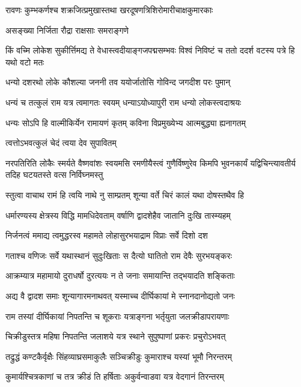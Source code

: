 \twolineshloka
{रावणः कुम्भकर्णश्च शक्रजित्प्रमुखास्तथा}
{खरदूषणत्रिशिरोमारीचाक्षकुमारकाः}%

\onelineshloka
{असङ्ख्या निर्जिता रौद्रा राक्षसाः समराङ्गणे}%

\twolineshloka
{किं वच्मि लोकेश सुकीर्त्तिमद्य ते वेधास्त्वदीयाङ्गजपद्मसम्भवः}
{विश्वं निविष्टं च ततो ददर्श वटस्य पत्रे हि यथो वटो मतः}%

\twolineshloka
{धन्यो दशरथो लोके कौशल्या जननी तव}
{ययोर्जातोसि गोविन्द जगदीश परः पुमान्}%

\twolineshloka
{धन्यं च तत्कुलं राम यत्र त्वमागतः स्वयम्}
{धन्याऽयोध्यापुरी राम धन्यो लोकस्त्वदाश्रयः}%

\twolineshloka
{धन्यः सोऽपि हि वाल्मीकिर्येन रामायणं कृतम्}
{कविना विप्रमुख्येभ्य आत्मबुद्ध्या ह्यनागतम्}%

\onelineshloka
{त्वत्तोऽभवत्कुलं चेदं त्वया देव सुपावितम्}%

\twolineshloka
{नरपतिरिति लोकैः स्मर्यते वैष्णवांशः स्वयमसि रमणीयैस्त्वं गुणैर्विष्णुरेव}
{किमपि भुवनकार्यं यद्विचिन्त्यावतीर्य तदिह घटयतस्ते वत्स निर्विघ्नमस्तु}%

\twolineshloka
{स्तुत्वा वाचाथ रामं हि त्वयि नाथे नु साम्प्रतम्}
{शून्या वर्ते चिरं कालं यथा दोषस्तथैव हि}%

\twolineshloka
{धर्मारण्यस्य क्षेत्रस्य विद्धि मामधिदेवताम्}
{वर्षाणि द्वादशेहैव जातानि दुःखि तास्म्यहम्}%

\twolineshloka
{निर्जनत्वं ममाद्य त्वमुद्धरस्व महामते}
{लोहासुरभयाद्राम विप्राः सर्वे दिशो दश}%

\twolineshloka
{गताश्च वणिजः सर्वे यथास्थानं सुदुःखिताः}
{स दैत्यो घातितो राम देवैः सुरभयङ्करः}%

\twolineshloka
{आक्रम्यात्र महामायो दुराधर्षो दुरत्ययः}
{न ते जनाः समायान्ति तद्भयादति शङ्किताः}%

\twolineshloka
{अद्य वै द्वादश समाः शून्यागारमनाथवत्}
{यस्माच्च दीर्घिकायां मे स्नानदानोद्यतो जनः}%

\twolineshloka
{राम तस्यां दीर्घिकायां निपतन्ति च शूकराः}
{यत्राङ्गना भर्तृयुता जलक्रीडापरायणाः}%

\twolineshloka
{चिक्रीडुस्तत्र महिषा निपतन्ति जलाशये}
{यत्र स्थाने सुपुष्पाणां प्रकरः प्रचुरोऽभवत्}%

\twolineshloka
{तद्रुद्धं कण्टकैर्वृक्षैः सिंहव्याघ्रसमाकुलैः}
{सञ्चिक्रीडुः कुमाराश्च यस्यां भूमौ निरन्तरम्}%

\twolineshloka
{कुमार्यश्चित्रकाणां च तत्र क्रीडं ति हर्षिताः}
{अकुर्वन्वाडवा यत्र वेदगानं तिरन्तरम्}%


